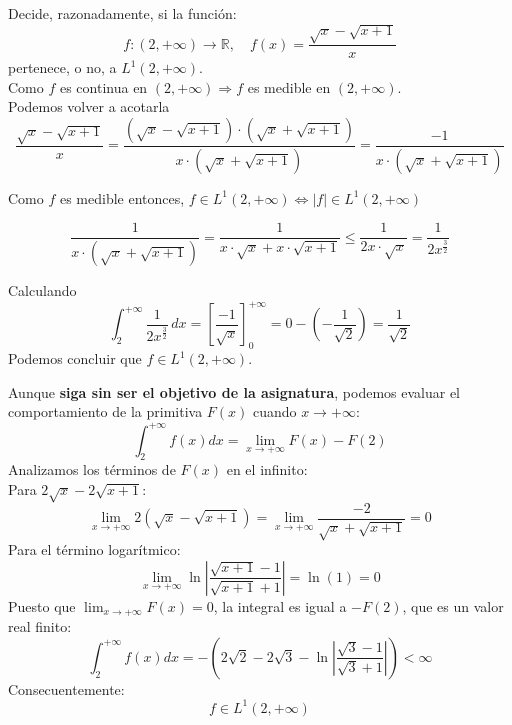 \documentclass[12pt]{article}
\begin{document}
    \begin{ejercicio}[3 puntos]
        Decide, razonadamente, si la función:
        $$ f: (2, +\infty) \rightarrow \mathbb{R}, \quad f(x) = \frac{\sqrt{x} - \sqrt{x+1}}{x} $$
        pertenece, o no, a $L^1(2, +\infty)$. \\

        Como $f$ es continua en $(2, +\infty) \Rightarrow f$ es medible en $(2, +\infty)$.\\
        
        Podemos volver a acotarla
        $$\frac{\sqrt{x} - \sqrt{x+1}}{x} = \frac{(\sqrt{x} - \sqrt{x+1})\cdot (\sqrt{x} + \sqrt{x+1})}{x\cdot (\sqrt{x} + \sqrt{x+1})}= \frac{-1}{x\cdot (\sqrt{x} + \sqrt{x+1})}$$

        Como $f$ es medible entonces, $f \in L^1(2, +\infty) \iff |f| \in L^1(2, +\infty)$

        $$\frac{1}{x\cdot (\sqrt{x} + \sqrt{x+1})} = \frac{1}{x\cdot\sqrt{x} + x\cdot \sqrt{x+1}} \leq \frac{1}{2x\cdot\sqrt{x}} = \frac{1}{2x^{\frac{3}{2}}}$$

        Calculando $$\int^{+\infty}_2 \frac{1}{2x^{\frac{3}{2}}} \, dx = \left[ \frac{-1}{\sqrt{x}}\right]^{+\infty}_0=0-\left(-\frac{1}{\sqrt{2}}\right) = \frac{1}{\sqrt{2}}$$
        Podemos concluir que $f \in L^1(2, +\infty) $.

        \vspace{1cm}
        
        Aunque \textbf{siga sin ser el objetivo de la asignatura}, podemos evaluar el comportamiento de la primitiva $F(x)$ cuando $x \to +\infty$:
        $$ \int_{2}^{+\infty} f(x) dx = \lim_{x \to +\infty} F(x) - F(2) $$
        Analizamos los términos de $F(x)$ en el infinito: \\
        
        Para $2\sqrt{x} - 2\sqrt{x+1}$:
        $$ \lim_{x \to +\infty} 2(\sqrt{x} - \sqrt{x+1}) = \lim_{x \to +\infty} \frac{-2}{\sqrt{x} + \sqrt{x+1}} = 0 $$
        Para el término logarítmico:
        $$ \lim_{x \to +\infty} \ln\left| \frac{\sqrt{x+1}-1}{\sqrt{x+1}+1} \right| = \ln(1) = 0 $$
        Puesto que $\lim_{x \to +\infty} F(x) = 0$, la integral es igual a $-F(2)$, que es un valor real finito:
        $$ \int_{2}^{+\infty} f(x) dx = - \left( 2\sqrt{2} - 2\sqrt{3} - \ln\left| \frac{\sqrt{3}-1}{\sqrt{3}+1} \right| \right) < \infty $$
        Consecuentemente:
        $$ f \in L^1(2, +\infty) $$
    \end{ejercicio}

    
\end{document}
